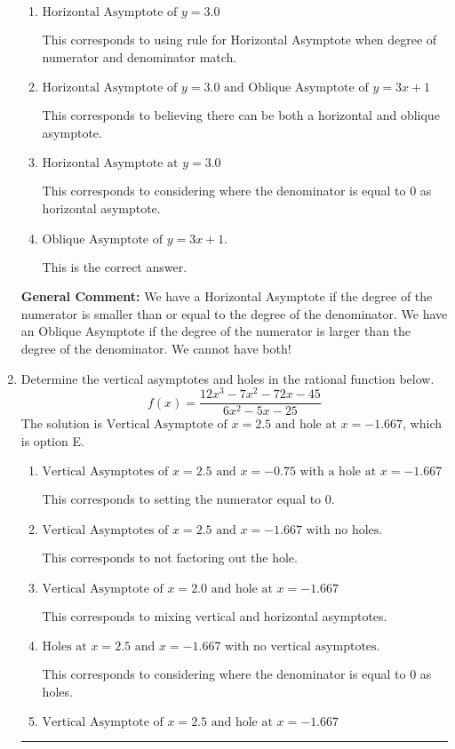 \documentclass{extbook}[14pt]
\newcommand{\litem}[1]{\item #1

\rule{\textwidth}{0.4pt}}
\begin{document}
\begin{enumerate}
{\begin{enumerate}[label=\Alph*.]
This corresponds to believing there can be both a horizontal and oblique asymptote AND mixing up horizontal/vertical asymoptote.
\item \( \text{Horizontal Asymptote of } y = 3.0  \)

This corresponds to using rule for Horizontal Asymptote when degree of numerator and denominator match.
\item \( \text{Horizontal Asymptote of } y = 3.0 \text{ and Oblique Asymptote of } y = 3x + 1 \)

This corresponds to believing there can be both a horizontal and oblique asymptote.
\item \( \text{Horizontal Asymptote at } y = 3.0 \)

This corresponds to considering where the denominator is equal to 0 as horizontal asymptote.
\item \( \text{Oblique Asymptote of } y = 3x + 1. \)

This is the correct answer.
\end{enumerate}

\textbf{General Comment:} We have a Horizontal Asymptote if the degree of the numerator is smaller than or equal to the degree of the denominator. We have an Oblique Asymptote if the degree of the numerator is larger than the degree of the denominator. We cannot have both!
}
\litem{
Determine the vertical asymptotes and holes in the rational function below.
\[ f(x) = \frac{12x^{3} -7 x^{2} -72 x -45}{6x^{2} -5 x -25} \]The solution is \( \text{Vertical Asymptote of } x = 2.5 \text{ and hole at } x = -1.667 \), which is option E.\begin{enumerate}[label=\Alph*.]
\item \( \text{Vertical Asymptotes of } x = 2.5 \text{ and } x = -0.75 \text{ with a hole at } x = -1.667 \)

This corresponds to setting the numerator equal to 0.
\item \( \text{Vertical Asymptotes of } x = 2.5 \text{ and } x = -1.667 \text{ with no holes.} \)

This corresponds to not factoring out the hole.
\item \( \text{Vertical Asymptote of } x = 2.0 \text{ and hole at } x = -1.667 \)

This corresponds to mixing vertical and horizontal asymptotes.
\item \( \text{Holes at } x = 2.5 \text{ and } x = -1.667 \text{ with no vertical asymptotes.} \)

This corresponds to considering where the denominator is equal to 0 as holes.
\item \( \text{Vertical Asymptote of } x = 2.5 \text{ and hole at } x = -1.667 \)


\end{enumerate}}
\end{enumerate}
\end{document}
